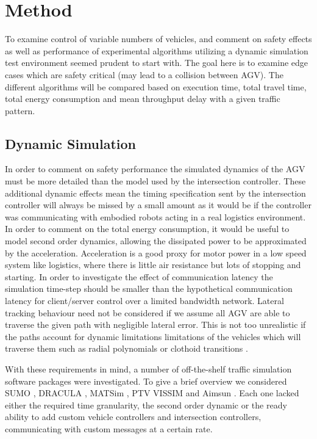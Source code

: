 \section{Method}
To examine control of variable numbers of vehicles, and comment on safety effects as well as performance of experimental algorithms utilizing a dynamic simulation test environment seemed prudent to start with. The goal here is to examine edge cases which are safety critical (may lead to a collision between AGV). The different algorithms will be compared based on execution time, total travel time, total energy consumption and mean throughput delay with a given traffic pattern.  

\subsection{Dynamic Simulation}
In order to comment on safety performance the simulated dynamics of the AGV must be more detailed than the model used by the intersection controller. These additional dynamic effects mean the timing specification sent by the intersection controller will always be missed by a small amount as it would be if the controller was communicating with embodied robots acting in a real logistics environment. In order to comment on the total energy consumption, it would be useful to model second order dynamics, allowing the dissipated power to be approximated by the acceleration. Acceleration is a good proxy for motor power in a low speed system like logistics, where there is little air resistance but lots of stopping and starting. In order to investigate the effect of communication latency the simulation time-step should be smaller than the hypothetical communication latency for client/server control over a limited bandwidth network. Lateral tracking behaviour need not be considered if we assume all AGV are able to traverse the given path with negligible lateral error. This is not too unrealistic if the paths account for dynamic limitations limitations of the vehicles which will traverse them such as radial polynomials \cite{Digani2014obs} or clothoid transitions \cite{lambertoptimalobstacles}.

With these requirements in mind, a number of off-the-shelf traffic simulation software packages were investigated. To give a brief overview we considered SUMO \cite{Busquets2016}, DRACULA \cite{Liu2005}, MATSim \cite{AndreasHorni2016}, PTV VISSIM \cite{Kara2014} and Aimsun \cite{lenorzer2015modelling}. Each one lacked either the required time granularity, the second order dynamic or the ready ability to add custom vehicle controllers and intersection controllers, communicating with custom messages at a certain rate.

